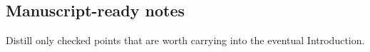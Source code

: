 \documentclass[11pt]{article}
\begin{document}
\subsection{Manuscript-ready notes}
Distill only checked points that are worth carrying into the eventual Introduction.




\end{document}
